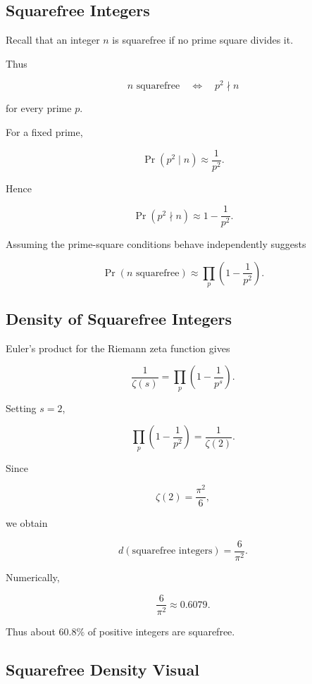 \subsection{Squarefree Integers}
\label{subsec:probabilistic-squarefree-integers}

Recall that an integer \(n\) is squarefree if no prime square divides it.

Thus

\[ n\text{ squarefree}\quad\Longleftrightarrow\quad p^2\nmid n \]

for every prime \(p\).

For a fixed prime,

\[ \Pr(p^2\mid n)\approx\frac1{p^2}. \]

Hence

\[ \Pr(p^2\nmid n)\approx1-\frac1{p^2}. \]

Assuming the prime-square conditions behave independently suggests

\[ \Pr(n\text{ squarefree})\approx\prod_p\left(1-\frac1{p^2}\right). \]

\subsection{Density of Squarefree Integers}
\label{subsec:density-squarefree}

Euler's product for the Riemann zeta function gives

\[ \frac1{\zeta(s)}=\prod_p\left(1-\frac1{p^s}\right). \]

Setting \(s=2\),

\[ \prod_p\left(1-\frac1{p^2}\right)=\frac1{\zeta(2)}. \]

Since

\[ \zeta(2)=\frac{\pi^2}{6}, \]

we obtain

\[ \boxed{d(\text{squarefree integers})=\frac6{\pi^2}.} \]

Numerically,

\[ \frac6{\pi^2}\approx0.6079. \]

Thus about \(60.8\%\) of positive integers are squarefree.

\subsection{Squarefree Density Visual}
\label{subsec:squarefree-density-visual}

